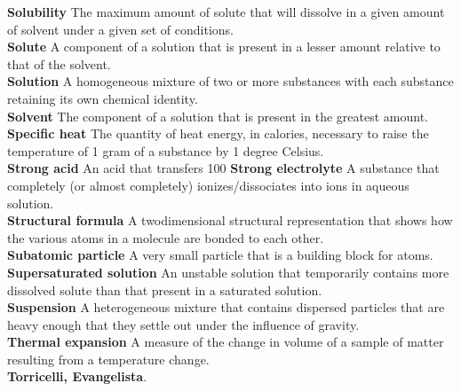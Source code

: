 \documentclass[10pt, roman]{article}
\begin{document}
\begin{minipage}[c]{0.30\textwidth}
\textbf{Solubility} The maximum amount of solute that will dissolve in a given amount of solvent under a given set of conditions. \\
\textbf{Solute} A component of a solution that is present in a lesser amount relative to that of the solvent. \\
\textbf{Solution} A homogeneous mixture of two or more substances with each substance retaining its own chemical identity. \\
\textbf{Solvent} The component of a solution that is present in the greatest amount. \\
\textbf{Specific heat} The quantity of heat energy, in calories, necessary to raise the temperature of 1 gram of a substance by 1 degree Celsius. \\
\textbf{Strong acid} An acid that transfers 100%
\textbf{Strong electrolyte} A substance that completely (or almost completely) ionizes/dissociates into ions in aqueous solution. \\
\textbf{Structural formula} A twodimensional structural representation that shows how the various atoms in a molecule are bonded to each other. \\
\textbf{Subatomic particle} A very small particle that is a building block for atoms. \\
\textbf{Supersaturated solution} An unstable solution that temporarily contains more dissolved solute than that present in a saturated solution. \\
\textbf{Suspension} A heterogeneous mixture that contains dispersed particles that are heavy enough that they settle out under the influence of gravity. \\
\textbf{Thermal expansion} A measure of the change in volume of a sample of matter resulting from a temperature change. \\
\textbf{Torricelli, Evangelista}. \\
\end{minipage}%
\newpage
\end{document}
